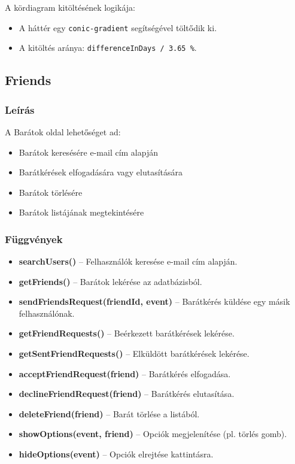\documentclass[12pt]{report}
\begin{document}
A kördiagram kitöltésének logikája:
\begin{itemize}
  \item A háttér egy \texttt{conic-gradient} segítségével töltődik ki.
  \item A kitöltés aránya: \texttt{differenceInDays / 3.65 \%}.
\end{itemize}

 \subsection{Friends}

\subsubsection{Leírás}
A Barátok oldal lehetőséget ad:
\begin{itemize}
  \item Barátok keresésére e-mail cím alapján
  \item Barátkérések elfogadására vagy elutasítására
  \item Barátok törlésére
  \item Barátok listájának megtekintésére
\end{itemize}

\subsubsection{Függvények}

\begin{itemize}
  \item \textbf{searchUsers()} -- Felhasználók keresése e-mail cím alapján.
  \item \textbf{getFriends()} -- Barátok lekérése az adatbázisból.
  \item \textbf{sendFriendsRequest(friendId, event)} -- Barátkérés küldése egy másik felhasználónak.
  \item \textbf{getFriendRequests()} -- Beérkezett barátkérések lekérése.
  \item \textbf{getSentFriendRequests()} -- Elküldött barátkérések lekérése.
  \item \textbf{acceptFriendRequest(friend)} -- Barátkérés elfogadása.
  \item \textbf{declineFriendRequest(friend)} -- Barátkérés elutasítása.
  \item \textbf{deleteFriend(friend)} -- Barát törlése a listából.
  \item \textbf{showOptions(event, friend)} -- Opciók megjelenítése (pl. törlés gomb).
  \item \textbf{hideOptions(event)} -- Opciók elrejtése kattintásra.
\end{itemize}
\end{document}
